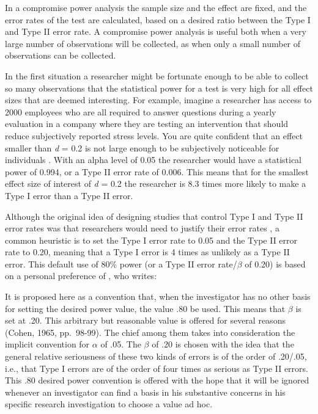 \documentclass[
  oneside]{krantz}
\renewenvironment{quote}{\begin{VF}}{\end{VF}}
\begin{document}
In a compromise power analysis the sample size and the effect are fixed, and the error rates of the test are calculated, based on a desired ratio between the Type I and Type II error rate. A compromise power analysis is useful both when a very large number of observations will be collected, as when only a small number of observations can be collected.

In the first situation a researcher might be fortunate enough to be able to collect so many observations that the statistical power for a test is very high for all effect sizes that are deemed interesting. For example, imagine a researcher has access to 2000 employees who are all required to answer questions during a yearly evaluation in a company where they are testing an intervention that should reduce subjectively reported stress levels. You are quite confident that an effect smaller than \emph{d} = 0.2 is not large enough to be subjectively noticeable for individuals \citep{jaeschke_measurement_1989}. With an alpha level of 0.05 the researcher would have a statistical power of 0.994, or a Type II error rate of 0.006. This means that for the smallest effect size of interest of \emph{d} = 0.2 the researcher is 8.3 times more likely to make a Type I error than a Type II error.

Although the original idea of designing studies that control Type I and Type II error rates was that researchers would need to justify their error rates \citep{neyman_problem_1933}, a common heuristic is to set the Type I error rate to 0.05 and the Type II error rate to 0.20, meaning that a Type I error is 4 times as unlikely as a Type II error. This default use of 80\% power (or a Type II error rate/\(\beta\) of 0.20) is based on a personal preference of \citet{cohen_statistical_1988}, who writes:

\begin{quote}
It is proposed here as a convention that, when the investigator has no other basis for setting the desired power value, the value .80 be used. This means that \(\beta\) is set at .20. This arbitrary but reasonable value is offered for several reasons (Cohen, 1965, pp.~98-99). The chief among them takes into consideration the implicit convention for \(\alpha\) of .05. The \(\beta\) of .20 is chosen with the idea that the general relative seriousness of these two kinds of errors is of the order of .20/.05, i.e., that Type I errors are of the order of four times as serious as Type II errors. This .80 desired power convention is offered with the hope that it will be ignored whenever an investigator can find a basis in his substantive concerns in his specific research investigation to choose a value ad hoc.
\end{quote}
\end{document}
